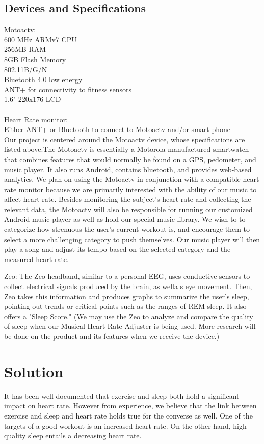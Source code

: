 \documentclass[letterpaper,english, 12pt]{scrreprt}
\begin{document}
\subsection{Devices and Specifications}
Motoactv:\\
600 MHz ARMv7 CPU\\
256MB RAM\\
8GB Flash Memory\\
802.11B/G/N\\
Bluetooth 4.0 low energy\\
ANT+ for connectivity to fitness sensors\\
1.6" 220x176 LCD\\
\\
Heart Rate monitor:\\
Either ANT+ or Bluetooth to connect to Motoactv and/or smart phone\\

Our project is centered around the Motoactv device, whose specifications are listed above.The Motoactv is essentially a Motorola-manufactured smartwatch that combines features that would normally be found on a GPS, pedometer, and music player. It also runs Android, contains bluetooth, and provides web-based analytics. We plan on using the Motoactv in conjunction with a compatible heart rate monitor because we are primarily interested with the ability of our music to affect heart rate. Besides monitoring the subject's heart rate and collecting the relevant data, the Motoactv will also be responsible for running our customized Android music player as well as hold our special music library. We wish to to categorize how strenuous the user's current workout is, and encourage them to select a more challenging category to push themselves. Our music player will then play a song and adjust its tempo based on the selected category and the measured heart rate.

Zeo:
The Zeo headband, similar to a personal EEG, uses conductive sensors to collect electrical signals produced by the brain, as wella s eye movement. Then, Zeo takes this information and produces graphs to summarize the user's sleep, pointing out trends or critical points such as the ranges of REM sleep. It also offers a "Sleep Score." (We may use the Zeo to analyze and compare the quality of sleep when our Musical Heart Rate Adjuster is being used. More research will be done on the product and its features when we receive the device.)
			 
\section{Solution}
It has been well documented that exercise and sleep both hold a significant impact on heart rate. However from experience, we believe that the link between exercise and sleep and heart rate holds true for the converse as well. One of the targets of a good workout is an increased heart rate. On the other hand, high-quality sleep entails a decreasing heart rate.
			 
\end{document}

